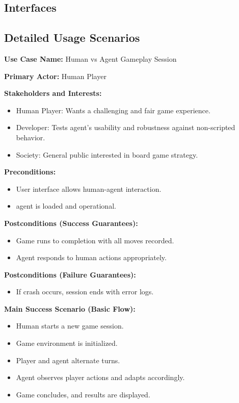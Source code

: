 \documentclass{article}
\begin{document}
\subsection{Interfaces}\label{subsec:interfaces}
\subsection{Detailed Usage Scenarios}\label{subsec:detailed-usage-scenarios}

\noindent\textbf{Use Case Name:} Human vs \RL{} Agent Gameplay Session

\noindent\textbf{Primary Actor:} Human Player

\noindent\textbf{Stakeholders and Interests:}
\begin{itemize}
    \item Human Player: Wants a challenging and fair game experience.
    \item Developer: Tests agent's usability and robustness against non-scripted behavior.
    \item Society: General public interested in board game strategy.
\end{itemize}

\noindent\textbf{Preconditions:}
\begin{itemize}
    \item User interface allows human-agent interaction.
    \item \RL{} agent is loaded and operational.
\end{itemize}

\noindent\textbf{Postconditions (Success Guarantees):}
\begin{itemize}
    \item Game runs to completion with all moves recorded.
    \item Agent responds to human actions appropriately.
\end{itemize}

\noindent\textbf{Postconditions (Failure Guarantees):}
\begin{itemize}
    \item If crash occurs, session ends with error logs.
\end{itemize}

\noindent\textbf{Main Success Scenario (Basic Flow):}
\begin{itemize}
    \item Human starts a new game session.
    \item Game environment is initialized.
    \item Player and \RL{} agent alternate turns.
    \item Agent observes player actions and adapts accordingly.
    \item Game concludes, and results are displayed.
\end{itemize}
\end{document}
